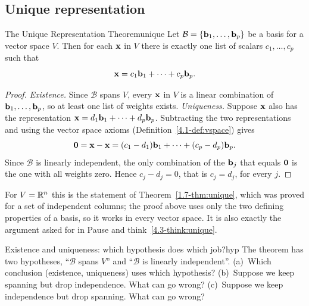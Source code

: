 \documentclass[11pt]{article}
\begin{document}
\subsection*{Unique representation}

\begin{thm}{The Unique Representation Theorem}{unique}
Let $\mathcal{B}=\{\mathbf{b}_1,\dots,\mathbf{b}_p\}$ be a basis for a vector space $V$. Then for each $\mathbf{x}$ in $V$ there is exactly one list of scalars $c_1,\dots,c_p$ such that
\[
\mathbf{x}=c_1\mathbf{b}_1+\cdots+c_p\mathbf{b}_p.
\]
\end{thm}

\begin{proof}
\emph{Existence.} Since $\mathcal{B}$ spans $V$, every $\mathbf{x}$ in $V$ is a linear combination of $\mathbf{b}_1,\dots,\mathbf{b}_p$, so at least one list of weights exists. \emph{Uniqueness.} Suppose $\mathbf{x}$ also has the representation $\mathbf{x}=d_1\mathbf{b}_1+\cdots+d_p\mathbf{b}_p$. Subtracting the two representations and using the vector space axioms (Definition~\ref{4.1-def:vspace}) gives
\[
\mathbf{0}=\mathbf{x}-\mathbf{x}=(c_1-d_1)\mathbf{b}_1+\cdots+(c_p-d_p)\mathbf{b}_p.
\]
Since $\mathcal{B}$ is linearly independent, the only combination of the $\mathbf{b}_j$ that equals $\mathbf{0}$ is the one with all weights zero. Hence $c_j-d_j=0$, that is $c_j=d_j$, for every $j$.
\end{proof}

For $V=\mathbb{R}^n$ this is the statement of Theorem~\ref{1.7-thm:unique}, which was proved for a set of independent columns; the proof above uses only the two defining properties of a basis, so it works in every vector space. It is also exactly the argument asked for in Pause and think~\ref{4.3-think:unique}.

\begin{think}{Existence and uniqueness: which hypothesis does which job?}{hyp}
The theorem has two hypotheses, ``$\mathcal{B}$ spans $V$'' and ``$\mathcal{B}$ is linearly independent''. (a)~Which conclusion (existence, uniqueness) uses which hypothesis? (b)~Suppose we keep spanning but drop independence. What can go wrong? (c)~Suppose we keep independence but drop spanning. What can go wrong?
\end{think}
\end{document}
